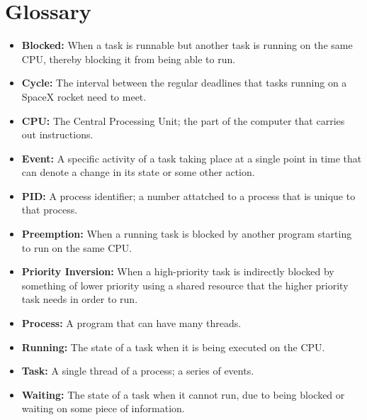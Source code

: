 \documentclass{hmcclinic}
\begin{document}
\section{Glossary}
\begin{itemize}[ ]
\item {\bf Blocked:} When a task is runnable but another task is running on the same CPU, thereby blocking it from being able to run.
\item {\bf Cycle:} The interval between the regular deadlines that tasks running on a SpaceX rocket need to meet.
\item {\bf CPU:} The Central Processing Unit; the part of the computer that carries out instructions.
\item{\bf Event:} A specific activity of a task taking place at a single point in time that can denote a change in its state or some other action.
\item {\bf PID:} A process identifier; a number attatched to a process that is unique to that process.
\item {\bf Preemption:} When a running task is blocked by another program starting to run on the same CPU. 
\item {\bf Priority Inversion:} When a high-priority task is indirectly blocked by something of
lower priority using a shared resource that the higher priority task needs in
order to run. 
\item{\bf Process:} A program that can have many threads.
\item {\bf Running:} The state of a task when it is being executed on the CPU.
\item {\bf Task:} A single thread of a process; a series of events.
\item {\bf Waiting:} The state of a task when it cannot run, due to being blocked or waiting on some piece of information.
\end{itemize}
\end{document}

